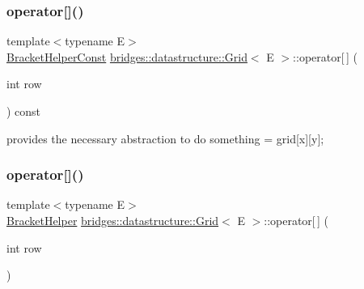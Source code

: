 \mbox{\label{classbridges_1_1datastructure_1_1_grid_a754a890728b6b268a1ba843da89cb1f6}} 
\subsubsection{\texorpdfstring{operator[]()}{operator[]()}\hspace{0.1cm}{\footnotesize\ttfamily [1/2]}}
{\footnotesize\ttfamily template$<$typename E$>$ \\
\mbox{\hyperlink{classbridges_1_1datastructure_1_1_grid_1_1_bracket_helper_const}{Bracket\+Helper\+Const}} \mbox{\hyperlink{classbridges_1_1datastructure_1_1_grid}{bridges\+::datastructure\+::\+Grid}}$<$ E $>$\+::operator\mbox{[}$\,$\mbox{]} (\begin{DoxyParamCaption}\item[{int}]{row }\end{DoxyParamCaption}) const\hspace{0.3cm}{\ttfamily [inline]}}



provides the necessary abstraction to do something = grid\mbox{[}x\mbox{]}\mbox{[}y\mbox{]}; 

\mbox{\label{classbridges_1_1datastructure_1_1_grid_ae5a7cf159c7918193ba75146660c3c1f}} 
\subsubsection{\texorpdfstring{operator[]()}{operator[]()}\hspace{0.1cm}{\footnotesize\ttfamily [2/2]}}
{\footnotesize\ttfamily template$<$typename E$>$ \\
\mbox{\hyperlink{classbridges_1_1datastructure_1_1_grid_1_1_bracket_helper}{Bracket\+Helper}} \mbox{\hyperlink{classbridges_1_1datastructure_1_1_grid}{bridges\+::datastructure\+::\+Grid}}$<$ E $>$\+::operator\mbox{[}$\,$\mbox{]} (\begin{DoxyParamCaption}\item[{int}]{row }\end{DoxyParamCaption})\hspace{0.3cm}{\ttfamily [inline]}}



